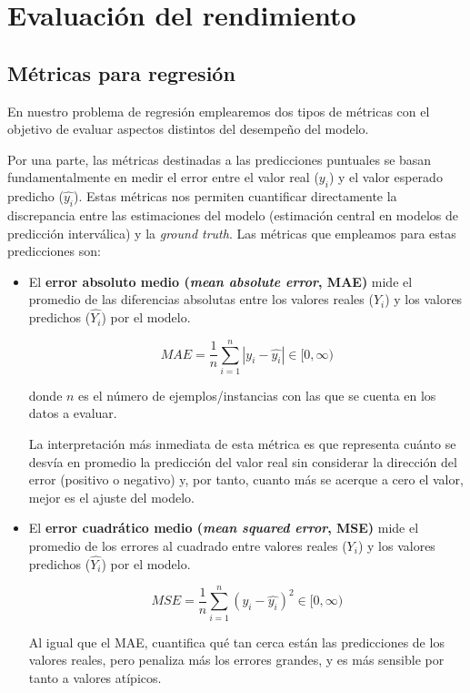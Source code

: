 \FloatBarrier

\thispagestyle{fancy}



\section{Evaluación del rendimiento}


\subsection{Métricas para regresión}

En nuestro problema de regresión emplearemos dos tipos de métricas con el objetivo de evaluar aspectos distintos del desempeño del modelo.

Por una parte, las métricas destinadas a las predicciones puntuales se basan fundamentalmente en medir el error entre el valor real ($y_i$) y el valor esperado predicho ($\hat{y_i}$). Estas métricas nos permiten cuantificar directamente la discrepancia entre las estimaciones del modelo (estimación central en modelos de predicción interválica) y la \textit{ground truth}. Las métricas que empleamos para estas predicciones son:

\begin{itemize}
    \item El \textbf{error absoluto medio (\textit{mean absolute error}, MAE)} mide el promedio de las diferencias absolutas entre los valores reales ($Y_i$) y los valores predichos ($\hat{Y_i}$) por el modelo.

    $$
    MAE = \frac{1}{n} \sum_{i=1}^n{|y_i - \hat{y_i}|} \in [0, \infty)
    $$

    donde $n$ es el número de ejemplos/instancias con las que se cuenta en los datos a evaluar.

    La interpretación más inmediata de esta métrica es que representa cuánto se desvía en promedio la predicción del valor real sin considerar la dirección del error (positivo o negativo) y, por tanto, cuanto más se acerque a cero el valor, mejor es el ajuste del modelo.

    \item El \textbf{error cuadrático medio (\textit{mean squared error}, MSE)} mide el promedio de los errores al cuadrado entre valores reales ($Y_i$) y los valores predichos ($\hat{Y_i}$) por el modelo.
    
    $$
    MSE = \frac{1}{n} \sum_{i=1}^n{(y_i - \hat{y_i})^2} \in [0, \infty)
    $$

    Al igual que el MAE, cuantifica qué tan cerca están las predicciones de los valores reales, pero penaliza más los errores grandes, y es más sensible por tanto a valores atípicos.

\end{itemize}


